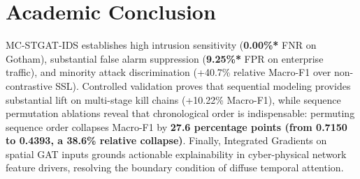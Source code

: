 \documentclass[10pt,a4paper]{article}
\newcommand{\best}[1]{\textbf{\textcolor{bestgreen}{#1*}}}
\begin{document}
\section{Academic Conclusion}
MC-STGAT-IDS establishes high intrusion sensitivity (\best{0.00\%} FNR on Gotham), substantial false alarm suppression (\best{9.25\%} FPR on enterprise traffic), and minority attack discrimination (+40.7\% relative Macro-F1 over non-contrastive SSL). Controlled validation proves that sequential modeling provides substantial lift on multi-stage kill chains (+10.22\% Macro-F1), while sequence permutation ablations reveal that chronological order is indispensable: permuting sequence order collapses Macro-F1 by \textbf{27.6 percentage points (from 0.7150 to 0.4393, a 38.6\% relative collapse)}. Finally, Integrated Gradients on spatial GAT inputs grounds actionable explainability in cyber-physical network feature drivers, resolving the boundary condition of diffuse temporal attention.
\end{document}
